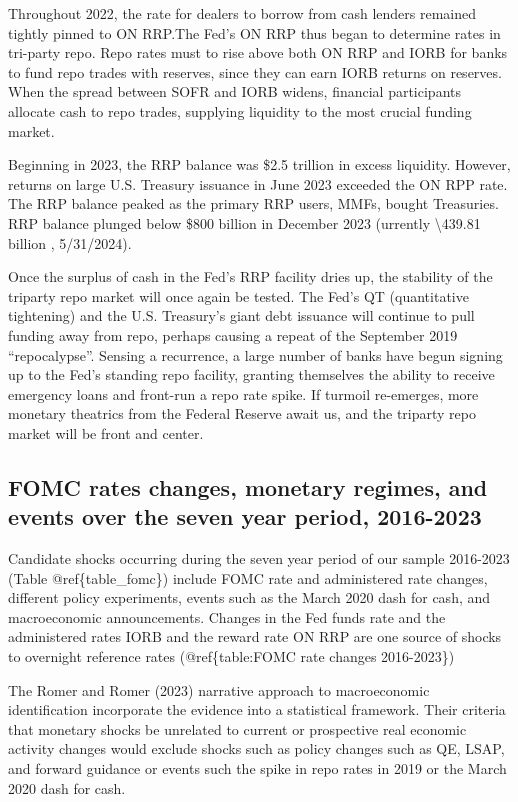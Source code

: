 \documentclass[
]{article}
\begin{document}
Throughout 2022, the rate for dealers to borrow from cash lenders remained tightly pinned to ON RRP.The Fed's ON RRP thus began to determine rates in tri-party repo. Repo rates must to rise above both ON RRP and IORB for banks to fund repo trades with reserves, since they can earn IORB returns on reserves. When the spread between SOFR and IORB widens, financial participants allocate cash to repo trades, supplying liquidity to the most crucial funding market.

Beginning in 2023, the RRP balance was \$2.5 trillion in excess liquidity. However, returns on large U.S. Treasury issuance in June 2023 exceeded the ON RPP rate. The RRP balance peaked as the primary RRP users, MMFs, bought Treasuries. RRP balance plunged below \$800 billion in December 2023 (urrently \textbackslash439.81 billion , 5/31/2024).

Once the surplus of cash in the Fed's RRP facility dries up, the stability of the triparty repo market will once again be tested. The Fed's QT (quantitative tightening) and the U.S. Treasury's giant debt issuance will continue to pull funding away from repo, perhaps causing a repeat of the September 2019 ``repocalypse''. Sensing a recurrence, a large number of banks have begun signing up to the Fed's standing repo facility, granting themselves the ability to receive emergency loans and front-run a repo rate spike. If turmoil re-emerges, more monetary theatrics from the Federal Reserve await us, and the triparty repo market will be front and center.

\hypertarget{fomc-rates-changes-monetary-regimes-and-events-over-the-seven-year-period-2016-2023}{%
\subsection{FOMC rates changes, monetary regimes, and events over the seven year period, 2016-2023}\label{fomc-rates-changes-monetary-regimes-and-events-over-the-seven-year-period-2016-2023}}

Candidate shocks occurring during the seven year period of our sample 2016-2023 (Table @ref\{table\_fomc\}) include FOMC rate and administered rate changes, different policy experiments, events such as the March 2020 dash for cash, and macroeconomic announcements. Changes in the Fed funds rate and the administered rates IORB and the reward rate ON RRP are one source of shocks to overnight reference rates (@ref\{table:FOMC rate changes 2016-2023\})

The Romer and Romer (2023) narrative approach to macroeconomic identification incorporate the evidence into a statistical framework. Their criteria that monetary shocks be unrelated to current or prospective real economic activity changes would exclude shocks such as policy changes such as QE, LSAP, and forward guidance or events such the spike in repo rates in 2019 or the March 2020 dash for cash.
\end{document}
